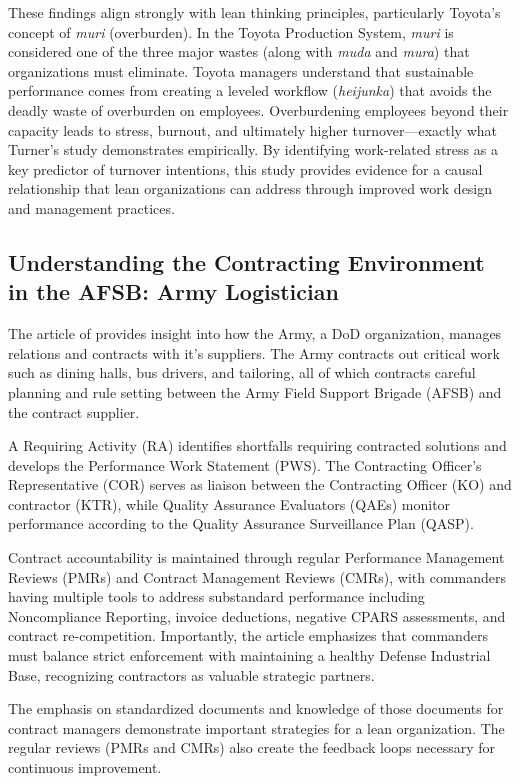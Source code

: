 \documentclass{article}
\begin{document}
		These findings align strongly with lean thinking principles, particularly Toyota's concept of \textit{muri} (overburden). 
		In the Toyota Production System, \textit{muri} is considered one of the three major wastes (along with \textit{muda} and \textit{mura}) that organizations must eliminate.
		Toyota managers understand that sustainable performance comes from creating a leveled workflow (\textit{heijunka}) that avoids the deadly waste of overburden on employees. 
		Overburdening employees beyond their capacity leads to stress, burnout, and ultimately higher turnover—exactly what Turner's study demonstrates empirically. 
		By identifying work-related stress as a key predictor of turnover intentions, this study provides evidence for a causal relationship that lean organizations can address through improved work design and management practices.


	\subsection{Understanding the Contracting Environment in the AFSB: Army Logistician \cite{Carlstedt2020}}

		The article of \cite{Carlstedt2020} provides insight into how the Army, a DoD organization, manages relations and contracts with it's suppliers.
		The Army contracts out critical work such as dining halls, bus drivers, and tailoring, all of which contracts careful planning and rule setting between the Army Field Support Brigade (AFSB) and the contract supplier. 

		A Requiring Activity (RA) identifies shortfalls requiring contracted solutions and develops the Performance Work Statement (PWS). 
		The Contracting Officer's Representative (COR) serves as liaison between the Contracting Officer (KO) and contractor (KTR), while Quality Assurance Evaluators (QAEs) monitor performance according to the Quality Assurance Surveillance Plan (QASP). 

		Contract accountability is maintained through regular Performance Management Reviews (PMRs) and Contract Management Reviews (CMRs), with commanders having multiple tools to address substandard performance including Noncompliance Reporting, invoice deductions, negative CPARS assessments, and contract re-competition. 
		Importantly, the article emphasizes that commanders must balance strict enforcement with maintaining a healthy Defense Industrial Base, recognizing contractors as valuable strategic partners.

		The emphasis on standardized documents and knowledge of those documents for contract managers demonstrate important strategies for a lean organization.
		The regular reviews (PMRs and CMRs) also create the feedback loops necessary for continuous improvement.
\end{document}
